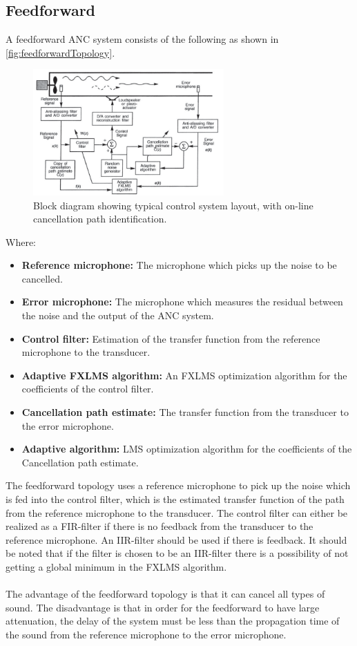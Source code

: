 \subsection{Feedforward}
A feedforward ANC system consists of the following as shown in \autoref{fig:feedforwardTopology}.
\begin{figure}[H]
	\centering
	\includegraphics[width=0.65\textwidth]{figures/BasicSystem/feedforward}
	\caption{Block diagram showing typical control system layout, with on-line cancellation path identification. \cite{Hansen2}}
	\label{fig:feedforwardTopology}
\end{figure}
\pagebreak
Where:
\begin{itemize}
\item \textbf{Reference microphone:} The microphone which picks up the noise to be cancelled.
\item \textbf{Error microphone:} The microphone which measures the residual between the noise and the output of the ANC system.
\item \textbf{Control filter:} Estimation of the transfer function from the reference microphone to the transducer. 
\item \textbf{Adaptive FXLMS algorithm:} An FXLMS optimization algorithm for the coefficients of the control filter.
\item \textbf{Cancellation path estimate:} The transfer function from the transducer to the error microphone.
\item \textbf{Adaptive algorithm:} LMS optimization algorithm for the coefficients of the Cancellation path estimate.
\end{itemize}

The feedforward topology uses a reference microphone to pick up the noise which is fed into the control filter, which is the estimated transfer function of the path from the reference microphone to the transducer. The control filter can either be realized as a FIR-filter if there is no feedback from the transducer to the reference microphone. An IIR-filter should be used if there is feedback. It should be noted that if the filter is chosen to be an IIR-filter there is a possibility of not getting a global minimum in the FXLMS algorithm.
\\\\
The advantage of the feedforward topology is that it can cancel all types of sound. The disadvantage is that in order for the feedforward to have large attenuation, the delay of the system must be less than the propagation time of the sound from the reference microphone to the error microphone.    



